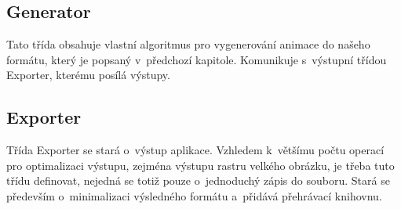 \subsection{Generator}

Tato třída obsahuje vlastní algoritmus pro vygenerování animace do našeho formátu, který je popsaný v~předchozí kapitole. Komunikuje s~výstupní třídou Exporter, kterému posílá výstupy.

\subsection{Exporter}

Třída Exporter se stará o~výstup aplikace. Vzhledem k~většímu počtu operací pro optimalizaci výstupu, zejména výstupu rastru velkého obrázku, je třeba tuto třídu definovat, nejedná se totiž pouze o~jednoduchý zápis do souboru. Stará se především o~minimalizaci výsledného formátu a~přidává přehrávací knihovnu.

